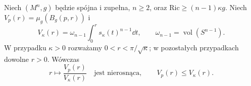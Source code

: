 \begin{twierdzenie}
\label{thm:bishop-gromov}
Niech $(M^n,g)$ będzie spójna i zupełna, $n\geq2$,
oraz $\mathrm{Ric}\geq(n-1)\kappa g$.
Niech $V_p(r)=\mu_g(B_g(p,r))$ i
\begin{equation}\label{eq:objetosc-kappa-model}
 V_\kappa(r)
 =\omega_{n-1}\int_0^r s_\kappa(t)^{n-1}\dd t,
 \qquad \omega_{n-1}=\operatorname{vol}(S^{n-1}).
\end{equation}
W przypadku $\kappa>0$ rozważamy
$0<r<\pi/\sqrt\kappa$; w pozostałych
przypadkach dowolne $r>0$. Wówczas
\begin{equation}\label{eq:bishop-gromov}
 r\longmapsto\frac{V_p(r)}{V_\kappa(r)}
 \quad\text{jest nierosnąca},\qquad
 V_p(r)\leq V_\kappa(r).
\end{equation}
\end{twierdzenie}
